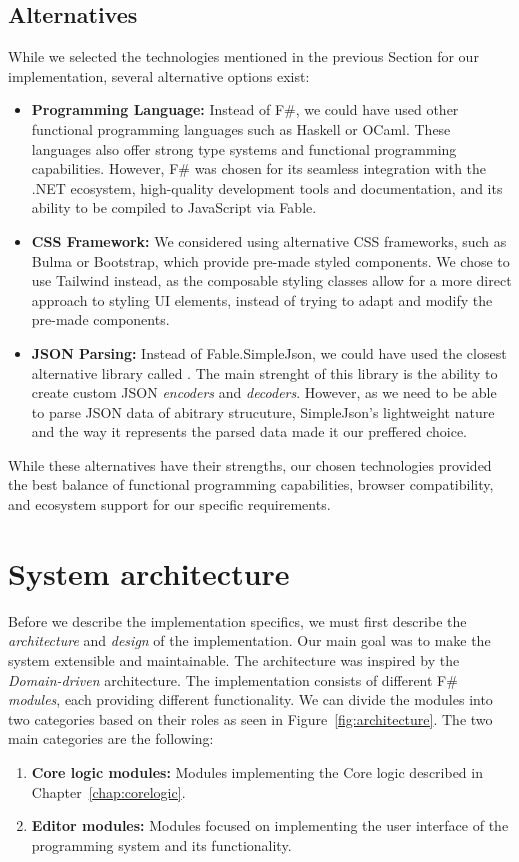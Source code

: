 \subsection{Alternatives}
While we selected the technologies mentioned in the previous Section for our implementation, several alternative options exist:
\begin{itemize}
	\item \textbf{Programming Language:} Instead of F\#, we could have used other functional programming languages such as Haskell or OCaml.
	      These languages also offer strong type systems and functional programming capabilities.
	      However, F\# was chosen for its seamless integration with the .NET ecosystem, high-quality development tools and documentation, and its ability to be compiled to JavaScript via Fable.

	\item \textbf{CSS Framework:} We considered using alternative CSS frameworks, such as Bulma or Bootstrap, which provide pre-made styled components.
	      We chose to use Tailwind instead, as the composable styling classes allow for a more direct approach to styling UI elements, instead of trying to adapt and modify the pre-made components.

	\item \textbf{JSON Parsing:} Instead of Fable.SimpleJson, we could have used the closest alternative library called \citet{thoth}.
	      The main strenght of this library is the ability to create custom JSON \emph{encoders} and \emph{decoders}.
	      However, as we need to be able to parse JSON data of abitrary strucuture, SimpleJson's lightweight nature and the way it represents the parsed data made it our preffered choice.
\end{itemize}
While these alternatives have their strengths, our chosen technologies provided the best balance of functional programming capabilities, browser compatibility, and ecosystem support for our specific requirements.


\section{System architecture}
\label{sec:appArch}
Before we describe the implementation specifics, we must first describe the \emph{architecture} and \emph{design} of the implementation.
Our main goal was to make the system extensible and maintainable.
The architecture was inspired by the \emph{Domain-driven} architecture.
The implementation consists of different F\# \emph{modules}, each providing different functionality.
We can divide the modules into two categories based on their roles as seen in Figure~\ref{fig:architecture}.
The two main categories are the following:
\begin{enumerate}
	\item \textbf{Core logic modules:} Modules implementing the Core logic described in Chapter~\ref{chap:corelogic}.
	\item \textbf{Editor modules:} Modules focused on implementing the user interface of the programming system and its functionality.
\end{enumerate}

